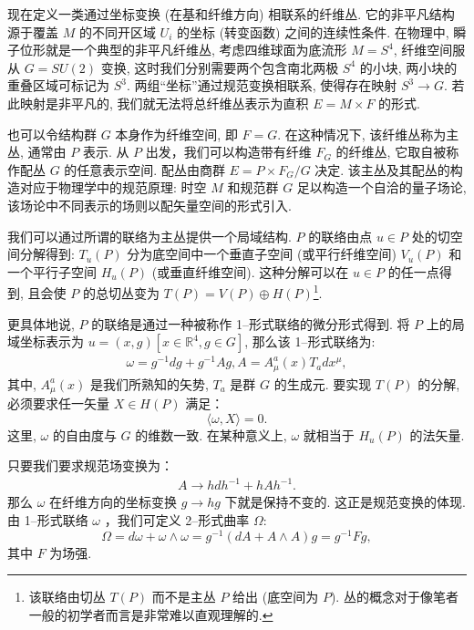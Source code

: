 \documentclass{article}
\begin{document}
现在定义一类通过坐标变换 (在基和纤维方向) 相联系的纤维丛. 它的非平凡结构源于覆盖 $M$ 的不同开区域 $U_{i}$ 的坐标 (转变函数) 之间的连续性条件. 在物理中, 瞬子位形就是一个典型的非平凡纤维丛, 考虑四维球面为底流形 $M = S^{4}$, 纤维空间服从 $G = SU(2)$ 变换, 这时我们分别需要两个包含南北两极 $S^{4}$ 的小块, 两小块的重叠区域可标记为 $S^{3}$. 两组``坐标''通过规范变换相联系, 使得存在映射 $S^{3}\rightarrow G$. 若此映射是非平凡的, 我们就无法将总纤维丛表示为直积 $E = M\times F$ 的形式.

\par 也可以令结构群 $G$ 本身作为纤维空间, 即 $F = G$. 在这种情况下, 该纤维丛称为主丛, 通常由 $P$ 表示. 从 $P$ 出发，我们可以构造带有纤维 $F_{G}$ 的纤维丛, 它取自被称作配丛 $G$ 的任意表示空间. 配丛由商群 $E = P\times F_{G}/G$ 决定. 该主丛及其配丛的构造对应于物理学中的规范原理: 时空 $M$ 和规范群 $G$ 足以构造一个自洽的量子场论, 该场论中不同表示的场则以配矢量空间的形式引入.

\par 我们可以通过所谓的联络为主丛提供一个局域结构. $P$ 的联络由点 $u \in P$ 处的切空间分解得到: $T_{u}(P)$ 分为底空间中一个垂直子空间 (或平行纤维空间) $V_{u}(P)$ 和一个平行子空间 $H_{u}(P)$ (或垂直纤维空间). 这种分解可以在 $u\in P$ 的任一点得到, 且会使 $P$ 的总切丛变为 $T(P)= V(P)\oplus H(P)$\footnote{该联络由切丛 $T(P)$ 而不是主丛 $P$ 给出 (底空间为 $P$). 丛的概念对于像笔者一般的初学者而言是非常难以直观理解的.}.

\par 更具体地说, $P$ 的联络是通过一种被称作 1--形式联络的微分形式得到. 将 $P$ 上的局域坐标表示为 $u =(x, g)[x\in \mathbb{R}^{4}, g\in G]$, 那么该 1--形式联络为:
\begin{align}
\omega = g^{-1}dg+g^{-1}Ag, A=A_{\mu}^{a}(x)T_{a}dx^{\mu},
\end{align}
其中, $A_{\mu}^{a}(x)$ 是我们所熟知的矢势, $T_{a}$ 是群 $G$ 的生成元. 要实现 $T(P)$ 的分解, 必须要求任一矢量 $X \in H(P)$ 满足：
\begin{equation}
\langle \omega, X\rangle=0.
\end{equation}
这里, $\omega$ 的自由度与 $G$ 的维数一致. 在某种意义上, $\omega$ 就相当于 $H_{u}(P)$ 的法矢量.

\par 只要我们要求规范场变换为：
\begin{align}
A \rightarrow hdh^{-1}+hAh^{-1}.
\end{align}
那么 $\omega$ 在纤维方向的坐标变换 $g \rightarrow hg$ 下就是保持不变的. 这正是规范变换的体现. 由 1--形式联络 $\omega$ ，我们可定义 2--形式曲率 $\Omega$:
\begin{equation}
\Omega=d\omega+\omega\wedge \omega=g^{-1}(dA+A\wedge A)g=g^{-1}Fg,
\end{equation}
其中 $F$ 为场强.
\end{document}

